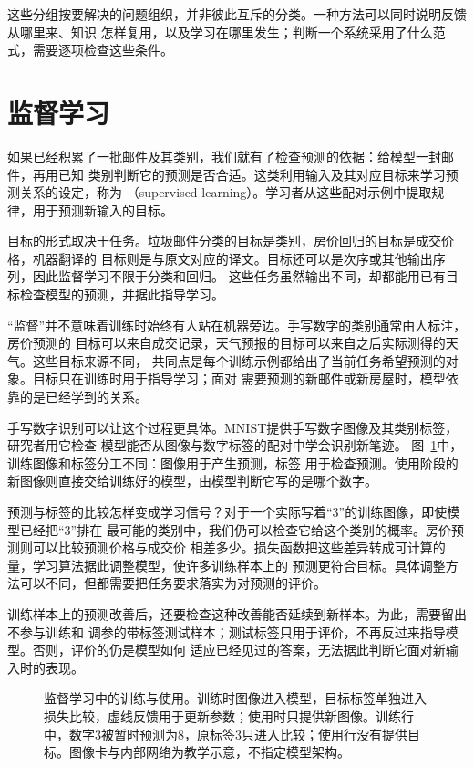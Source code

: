 这些分组按要解决的问题组织，并非彼此互斥的分类。一种方法可以同时说明反馈从哪里来、知识
怎样复用，以及学习在哪里发生；判断一个系统采用了什么范式，需要逐项检查这些条件。

\section{监督学习}
\label{sec:supervised-learning}

如果已经积累了一批邮件及其类别，我们就有了检查预测的依据：给模型一封邮件，再用已知
类别判断它的预测是否合适。这类利用输入及其对应目标来学习预测关系的设定，称为
（supervised learning）。学习者从这些配对示例中提取规律，用于预测新输入的目标。

目标的形式取决于任务。垃圾邮件分类的目标是类别，房价回归的目标是成交价格，机器翻译的
目标则是与原文对应的译文。目标还可以是次序或其他输出序列，因此监督学习不限于分类和回归。
这些任务虽然输出不同，却都能用已有目标检查模型的预测，并据此指导学习。

“监督”并不意味着训练时始终有人站在机器旁边。手写数字的类别通常由人标注，房价预测的
目标可以来自成交记录，天气预报的目标可以来自之后实际测得的天气。这些目标来源不同，
共同点是每个训练示例都给出了当前任务希望预测的对象。目标只在训练时用于指导学习；面对
需要预测的新邮件或新房屋时，模型依靠的是已经学到的关系。

手写数字识别可以让这个过程更具体。MNIST提供手写数字图像及其类别标签，研究者用它检查
模型能否从图像与数字标签的配对中学会识别新笔迹。
图~\ref{fig:supervised-mnist-process}中，训练图像和标签分工不同：图像用于产生预测，标签
用于检查预测。使用阶段的新图像则直接交给训练好的模型，由模型判断它写的是哪个数字。

预测与标签的比较怎样变成学习信号？对于一个实际写着“3”的训练图像，即使模型已经把“3”排在
最可能的类别中，我们仍可以检查它给这个类别的概率。房价预测则可以比较预测价格与成交价
相差多少。损失函数把这些差异转成可计算的量，学习算法据此调整模型，使许多训练样本上的
预测更符合目标。具体调整方法可以不同，但都需要把任务要求落实为对预测的评价。

训练样本上的预测改善后，还要检查这种改善能否延续到新样本。为此，需要留出不参与训练和
调参的带标签测试样本；测试标签只用于评价，不再反过来指导模型。否则，评价的仍是模型如何
适应已经见过的答案，无法据此判断它面对新输入时的表现。

\begin{figure}[htbp]
  \centering
  
  \caption{监督学习中的训练与使用。训练时图像进入模型，目标标签单独进入损失比较，虚线反馈用于更新参数；使用时只提供新图像。训练行中，数字3被暂时预测为8，原标签3只进入比较；使用行没有提供目标。图像卡与内部网络为教学示意，不指定模型架构。}
  \label{fig:supervised-mnist-process}
\end{figure}
\FloatBarrier


